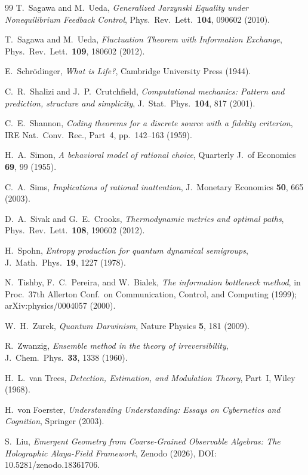 \documentclass[12pt,a4paper,openany]{book}
\begin{document}
\begin{thebibliography}{99}
T.~Sagawa and M.~Ueda,
\emph{Generalized Jarzynski Equality under Nonequilibrium Feedback Control},
Phys.\ Rev.\ Lett.\ \textbf{104}, 090602 (2010).

T.~Sagawa and M.~Ueda,
\emph{Fluctuation Theorem with Information Exchange},
Phys.\ Rev.\ Lett.\ \textbf{109}, 180602 (2012).

E.~Schr\"odinger,
\emph{What is Life?},
Cambridge University Press (1944).

C.~R.~Shalizi and J.~P.~Crutchfield,
\emph{Computational mechanics: Pattern and prediction, structure and simplicity},
J.\ Stat.\ Phys.\ \textbf{104}, 817 (2001).

C.~E.~Shannon,
\emph{Coding theorems for a discrete source with a
fidelity criterion},
IRE Nat.\ Conv.\ Rec., Part~4, pp.~142--163 (1959).

H.~A.~Simon,
\emph{A behavioral model of rational choice},
Quarterly J.\ of Economics \textbf{69}, 99 (1955).

C.~A.~Sims,
\emph{Implications of rational inattention},
J.\ Monetary Economics \textbf{50}, 665 (2003).

D.~A.~Sivak and G.~E.~Crooks,
\emph{Thermodynamic metrics and optimal paths},
Phys.\ Rev.\ Lett.\ \textbf{108}, 190602 (2012).

H.~Spohn,
\emph{Entropy production for quantum dynamical semigroups},
J.\ Math.\ Phys.\ \textbf{19}, 1227 (1978).

N.~Tishby, F.~C.~Pereira, and W.~Bialek,
\emph{The information bottleneck method},
in Proc.\ 37th Allerton Conf.\ on Communication, Control,
and Computing (1999); arXiv:physics/0004057 (2000).

W.~H.~Zurek,
\emph{Quantum Darwinism},
Nature Physics \textbf{5}, 181 (2009).

R.~Zwanzig,
\emph{Ensemble method in the theory of irreversibility},
J.\ Chem.\ Phys.\ \textbf{33}, 1338 (1960).

H.~L.~van Trees,
\emph{Detection, Estimation, and Modulation Theory},
Part~I, Wiley (1968).

H.~von Foerster,
\emph{Understanding Understanding: Essays on Cybernetics
and Cognition},
Springer (2003).

S.~Liu, \emph{Emergent Geometry from Coarse-Grained Observable Algebras: The Holographic Alaya-Field Framework}, Zenodo (2026), DOI: 10.5281/zenodo.18361706.


\end{thebibliography}
\end{document}
